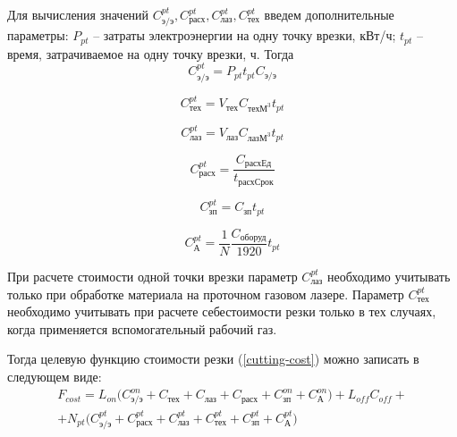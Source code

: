 \documentclass[11pt,twoside,openany]{report}
\begin{document}
Для вычисления значений
$C_\text{э/э}^{pt}, C_\text{расх}^{pt}, C_\text{лаз}^{pt}, C_\text{тех}^{pt}$
введем дополнительные параметры:
$P_{pt}$ -- затраты электроэнергии на одну точку врезки, кВт/ч;
$t_{pt}$ -- время, затрачиваемое на одну точку врезки, ч.
Тогда
\begin{equation}
  C_\text{э/э}^{pt} =
  P_{pt} t_{pt}   C_\text{э/э}
  \label{c-pt-ee}
\end{equation}

\begin{equation}
  C_\text{тех}^{pt} =
  V_\text{тех} C_{\text{техМ}^3} t_{pt}
  \label{c-pt-teh}
\end{equation}

\begin{equation}
  C_\text{лаз}^{pt} =
  V_\text{лаз} C_{\text{лазМ}^3} t_{pt}
  \label{c-pt-laz}
\end{equation}

\begin{equation}
  C_\text{расх}^{pt} =
  \frac{C_\text{расхЕд}}{t_\text{расхСрок}}
  \label{c-pt-rasx}
\end{equation}

\begin{equation}
  C_\text{зп}^{pt} =
  C_\text{зп} t_{pt}
  \label{c-pt-zp}
\end{equation}

\begin{equation}
  C_\text{А}^{pt} =
  \frac{1}N \frac{C_\text{оборуд}}{1920} t_{pt}
  \label{c-pt-A}
\end{equation}

При расчете стоимости одной точки врезки параметр
$C_\text{лаз}^{pt}$
необходимо учитывать только при обработке материала
на проточном газовом лазере.
Параметр
$C_\text{тех}^{pt}$
необходимо учитывать при расчете себестоимости резки только в тех случаях,
когда применяется вспомогательный рабочий газ.

Тогда целевую функцию стоимости резки (\ref{cutting-cost})
можно записать в следующем виде:
\begin{multline}
  F_{cost} =
  L_{on} \Big(
    C_\text{э/э}^{on} +
    C_\text{тех} +
    C_\text{лаз} +
    C_\text{расх} +
    C_\text{зп}^{on} +
    C_\text{А}^{on}
      \Big)
  +L_{off} C_{off} +
  \\
+ N_{pt} \Big(
    C_\text{э/э}^{pt} +
    C_\text{расх}^{pt} +
    C_\text{лаз}^{pt} +
    C_\text{тех}^{pt} +
    C_\text{зп}^{pt} +
    C_\text{А}^{pt}
      \Big)
  \label{c-full}
\end{multline}
\end{document}
